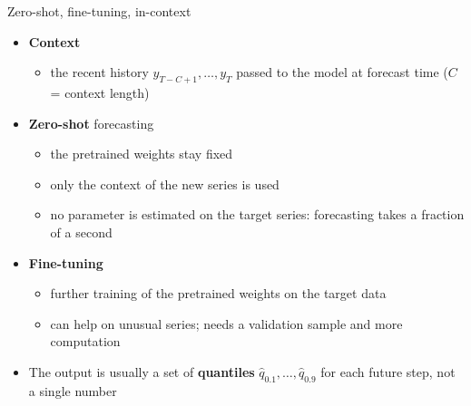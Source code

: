 \begin{frame}{Zero-shot, fine-tuning, in-context}
\itemsize{\small}
\begin{itemize}
    \item \textbf{Context}
    \begin{itemize}
        \item the recent history $y_{T-C+1}, \dots, y_T$ passed to the model at forecast time ($C$ = context length)
    \end{itemize}
    \item \textbf{Zero-shot} forecasting
    \begin{itemize}
        \item the pretrained weights stay fixed
        \item only the context of the new series is used
        \item no parameter is estimated on the target series: forecasting takes a fraction of a second
    \end{itemize}
    \item \textbf{Fine-tuning}
    \begin{itemize}
        \item further training of the pretrained weights on the target data
        \item can help on unusual series; needs a validation sample and more computation
    \end{itemize}
    \item The output is usually a set of \textbf{quantiles} $\hat q_{0.1}, \dots, \hat q_{0.9}$ for each future step, not a single number
\end{itemize}
\end{frame}

